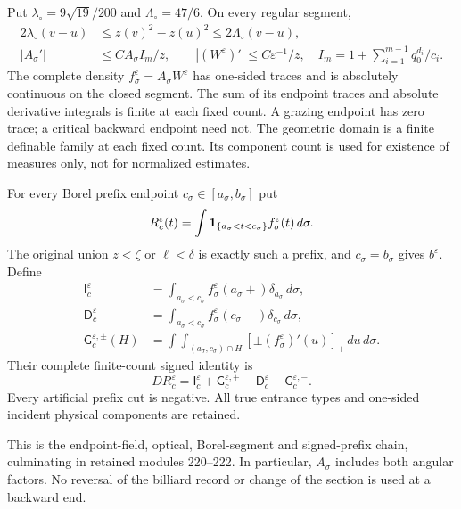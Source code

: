 \begin{inputstatement}
\label{input:v94-geometry}
Put $\lambda_\circ=9\sqrt{19}/200$ and $\Lambda_\circ=47/6$.
On every regular segment,
\begin{align}
 2\lambda_\circ(v-u)&\le z(v)^2-z(u)^2
                    \le2\Lambda_\circ(v-u),\label{eq:v94-radial}\\
 |A_\sigma'|&\le C A_\sigma I_m/z,\qquad
 |(W^\varepsilon)'|\le C\varepsilon^{-1}/z,
 \quad I_m=1+\sum_{i=1}^{m-1}q_0^{d_i}/c_i.\label{eq:v94-derivative}
\end{align}
The complete density $f_\sigma^\varepsilon=A_\sigma W^\varepsilon$
has one-sided traces and is absolutely continuous on the closed
segment. The sum of its endpoint traces and absolute derivative
integrals is finite at each fixed count. A grazing endpoint has zero
trace; a critical backward endpoint need not. The geometric domain
is a finite definable family at each fixed count. Its component count
is used for existence of measures only, not for normalized estimates.

For every Borel prefix endpoint $c_\sigma\in[a_\sigma,b_\sigma]$ put
\[
 R_c^\varepsilon(t)=\int\mathbf1_{\{a_\sigma<t<c_\sigma\}}
                              f_\sigma^\varepsilon(t)\,d\sigma.
\]
The original union $z<\zeta$ or $\ell<\delta$ is exactly such a
prefix, and $c_\sigma=b_\sigma$ gives $b^\varepsilon$. Define
\begin{align*}
 \mathsf I_c^\varepsilon&=\int_{a_\sigma<c_\sigma}
                  f_\sigma^\varepsilon(a_\sigma+)\delta_{a_\sigma}\,d\sigma,\\
 \mathsf D_c^\varepsilon&=\int_{a_\sigma<c_\sigma}
                  f_\sigma^\varepsilon(c_\sigma-)\delta_{c_\sigma}\,d\sigma,\\
 \mathsf G_c^{\varepsilon,\pm}(H)&=\int\int_{(a_\sigma,c_\sigma)\cap H}
                      [\pm(f_\sigma^\varepsilon)'(u)]_+\,du\,d\sigma.
\end{align*}
Their complete finite-count signed identity is
\begin{equation}\label{eq:v94-signed-input}
 D R_c^\varepsilon=\mathsf I_c^\varepsilon+
    \mathsf G_c^{\varepsilon,+}-\mathsf D_c^\varepsilon-
    \mathsf G_c^{\varepsilon,-}.
\end{equation}
Every artificial prefix cut is negative. All true entrance types and
one-sided incident physical components are retained.
\end{inputstatement}
This is the endpoint-field, optical, Borel-segment and signed-prefix
chain, culminating in retained modules 220--222. In particular,
$A_\sigma$ includes both angular factors. No reversal of the billiard
record or change of the section is used at a backward end.

